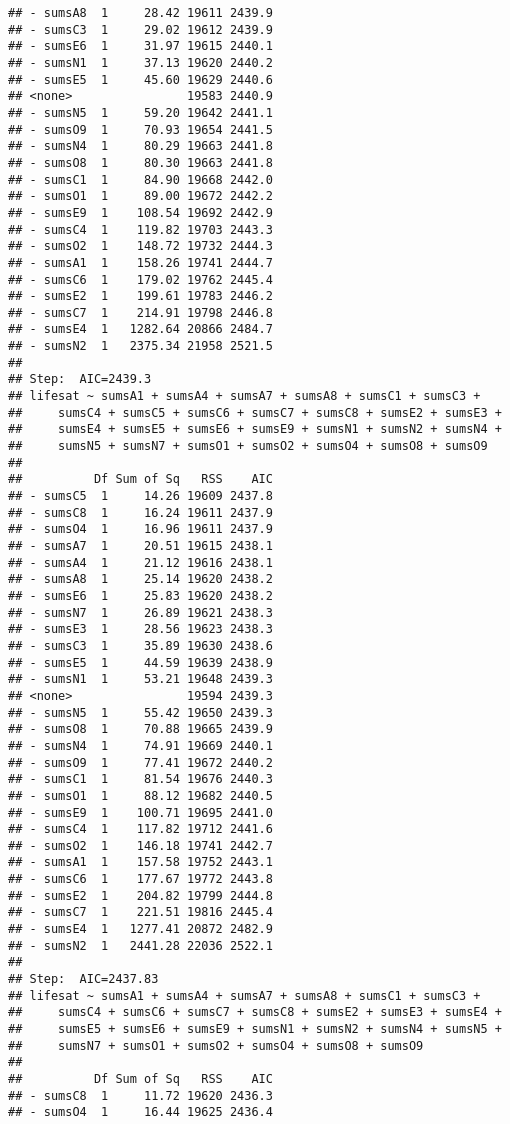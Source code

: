 \documentclass[,man,floatsintext]{apa6}
\begin{document}
\begin{verbatim}
## - sumsA8  1     28.42 19611 2439.9
## - sumsC3  1     29.02 19612 2439.9
## - sumsE6  1     31.97 19615 2440.1
## - sumsN1  1     37.13 19620 2440.2
## - sumsE5  1     45.60 19629 2440.6
## <none>                19583 2440.9
## - sumsN5  1     59.20 19642 2441.1
## - sumsO9  1     70.93 19654 2441.5
## - sumsN4  1     80.29 19663 2441.8
## - sumsO8  1     80.30 19663 2441.8
## - sumsC1  1     84.90 19668 2442.0
## - sumsO1  1     89.00 19672 2442.2
## - sumsE9  1    108.54 19692 2442.9
## - sumsC4  1    119.82 19703 2443.3
## - sumsO2  1    148.72 19732 2444.3
## - sumsA1  1    158.26 19741 2444.7
## - sumsC6  1    179.02 19762 2445.4
## - sumsE2  1    199.61 19783 2446.2
## - sumsC7  1    214.91 19798 2446.8
## - sumsE4  1   1282.64 20866 2484.7
## - sumsN2  1   2375.34 21958 2521.5
## 
## Step:  AIC=2439.3
## lifesat ~ sumsA1 + sumsA4 + sumsA7 + sumsA8 + sumsC1 + sumsC3 + 
##     sumsC4 + sumsC5 + sumsC6 + sumsC7 + sumsC8 + sumsE2 + sumsE3 + 
##     sumsE4 + sumsE5 + sumsE6 + sumsE9 + sumsN1 + sumsN2 + sumsN4 + 
##     sumsN5 + sumsN7 + sumsO1 + sumsO2 + sumsO4 + sumsO8 + sumsO9
## 
##          Df Sum of Sq   RSS    AIC
## - sumsC5  1     14.26 19609 2437.8
## - sumsC8  1     16.24 19611 2437.9
## - sumsO4  1     16.96 19611 2437.9
## - sumsA7  1     20.51 19615 2438.1
## - sumsA4  1     21.12 19616 2438.1
## - sumsA8  1     25.14 19620 2438.2
## - sumsE6  1     25.83 19620 2438.2
## - sumsN7  1     26.89 19621 2438.3
## - sumsE3  1     28.56 19623 2438.3
## - sumsC3  1     35.89 19630 2438.6
## - sumsE5  1     44.59 19639 2438.9
## - sumsN1  1     53.21 19648 2439.3
## <none>                19594 2439.3
## - sumsN5  1     55.42 19650 2439.3
## - sumsO8  1     70.88 19665 2439.9
## - sumsN4  1     74.91 19669 2440.1
## - sumsO9  1     77.41 19672 2440.2
## - sumsC1  1     81.54 19676 2440.3
## - sumsO1  1     88.12 19682 2440.5
## - sumsE9  1    100.71 19695 2441.0
## - sumsC4  1    117.82 19712 2441.6
## - sumsO2  1    146.18 19741 2442.7
## - sumsA1  1    157.58 19752 2443.1
## - sumsC6  1    177.67 19772 2443.8
## - sumsE2  1    204.82 19799 2444.8
## - sumsC7  1    221.51 19816 2445.4
## - sumsE4  1   1277.41 20872 2482.9
## - sumsN2  1   2441.28 22036 2522.1
## 
## Step:  AIC=2437.83
## lifesat ~ sumsA1 + sumsA4 + sumsA7 + sumsA8 + sumsC1 + sumsC3 + 
##     sumsC4 + sumsC6 + sumsC7 + sumsC8 + sumsE2 + sumsE3 + sumsE4 + 
##     sumsE5 + sumsE6 + sumsE9 + sumsN1 + sumsN2 + sumsN4 + sumsN5 + 
##     sumsN7 + sumsO1 + sumsO2 + sumsO4 + sumsO8 + sumsO9
## 
##          Df Sum of Sq   RSS    AIC
## - sumsC8  1     11.72 19620 2436.3
## - sumsO4  1     16.44 19625 2436.4

\end{verbatim}
\end{document}
